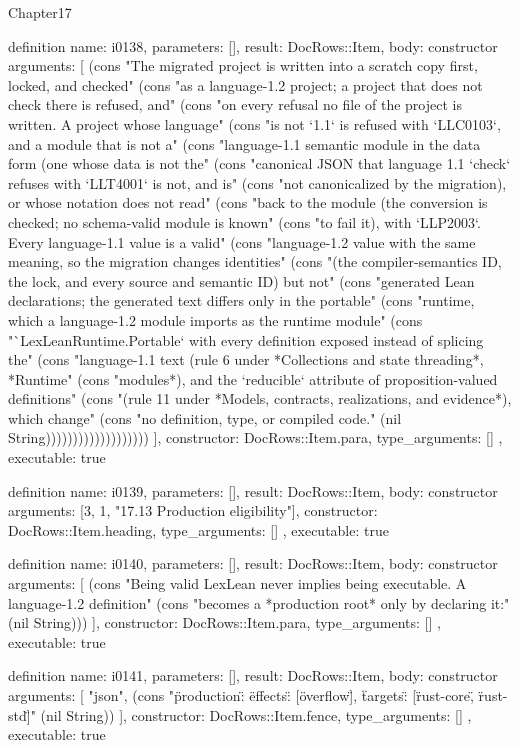 \begin{lexlean}{Chapter17}
\begin{semanticmodule}
definition{
  name: i0138,
  parameters: [],
  result: DocRows::Item,
  body: constructor{
    arguments: [
      (cons "The migrated project is written into a scratch copy first, locked, and checked" (cons "as a language-1.2 project; a project that does not check there is refused, and" (cons "on every refusal no file of the project is written. A project whose language" (cons "is not `1.1` is refused with `LLC0103`, and a module that is not a" (cons "language-1.1 semantic module in the data form (one whose data is not the" (cons "canonical JSON that language 1.1 `check` refuses with `LLT4001` is not, and is" (cons "not canonicalized by the migration), or whose notation does not read" (cons "back to the module (the conversion is checked; no schema-valid module is known" (cons "to fail it), with `LLP2003`. Every language-1.1 value is a valid" (cons "language-1.2 value with the same meaning, so the migration changes identities" (cons "(the compiler-semantics ID, the lock, and every source and semantic ID) but not" (cons "generated Lean declarations; the generated text differs only in the portable" (cons "runtime, which a language-1.2 module imports as the runtime module" (cons "`LexLeanRuntime.Portable` with every definition exposed instead of splicing the" (cons "language-1.1 text (rule 6 under *Collections and state threading*, *Runtime" (cons "modules*), and the `reducible` attribute of proposition-valued definitions" (cons "(rule 11 under *Models, contracts, realizations, and evidence*), which change" (cons "no definition, type, or compiled code." (nil String)))))))))))))))))))
    ],
    constructor: DocRows::Item.para,
    type_arguments: []
  },
  executable: true
}

definition{
  name: i0139,
  parameters: [],
  result: DocRows::Item,
  body: constructor{
    arguments: [3, 1, "17.13 Production eligibility"],
    constructor: DocRows::Item.heading,
    type_arguments: []
  },
  executable: true
}

definition{
  name: i0140,
  parameters: [],
  result: DocRows::Item,
  body: constructor{
    arguments: [
      (cons "Being valid LexLean never implies being executable. A language-1.2 definition" (cons "becomes a *production root* only by declaring it:" (nil String)))
    ],
    constructor: DocRows::Item.para,
    type_arguments: []
  },
  executable: true
}

definition{
  name: i0141,
  parameters: [],
  result: DocRows::Item,
  body: constructor{
    arguments: [
      "json",
      (cons "\"production\": {\"effects\": [\"overflow\"], \"targets\": [\"rust-core\", \"rust-std\"]}" (nil String))
    ],
    constructor: DocRows::Item.fence,
    type_arguments: []
  },
  executable: true
}


\end{semanticmodule}
\end{lexlean}
